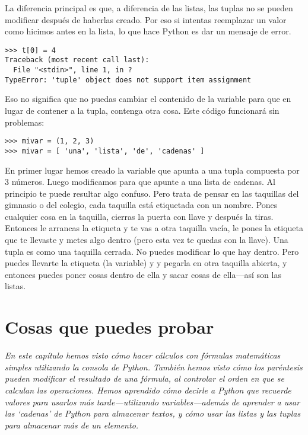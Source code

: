 La diferencia principal es que, a diferencia de las listas, las tuplas no se pueden modificar después de haberlas creado. Por eso si intentas reemplazar un valor como hicimos antes en la lista, lo que hace Python es dar un mensaje de error.

\begin{listing}
\begin{verbatim}
>>> t[0] = 4
Traceback (most recent call last):
  File "<stdin>", line 1, in ?
TypeError: 'tuple' object does not support item assignment
\end{verbatim}
\end{listing}

Eso no significa que no puedas cambiar el contenido de la variable para que en lugar de contener a la tupla, contenga otra cosa. Este código funcionará sin problemas:

\begin{listing}
\begin{verbatim}
>>> mivar = (1, 2, 3)
>>> mivar = [ 'una', 'lista', 'de', 'cadenas' ]
\end{verbatim}
\end{listing}

En primer lugar hemos creado la variable  que apunta a una tupla compuesta por 3 números. Luego modificamos  para que apunte a una lista de cadenas. Al principio te puede resultar algo confuso. Pero trata de pensar en las taquillas del gimnasio o del colegio, cada taquilla está etiquetada con un nombre. Pones cualquier cosa en la taquilla, cierras la puerta con llave y después la tiras. Entonces le arrancas la etiqueta y te vas a otra taquilla vacía, le pones la etiqueta que te llevaste y metes algo dentro (pero esta vez te quedas con la llave). Una tupla es como una taquilla cerrada. No puedes modificar lo que hay dentro. Pero puedes llevarte la etiqueta (la variable) y y pegarla en otra taquilla abierta, y entonces puedes poner cosas dentro de ella y sacar cosas de ella---así son las listas.

\section{Cosas que puedes probar}

\emph{En este capítulo hemos visto cómo hacer cálculos con fórmulas matemáticas simples utilizando la consola de Python. También hemos visto cómo los paréntesis pueden modificar el resultado de una fórmula, al controlar el orden en que se calculan las operaciones. Hemos aprendido cómo decirle a Python que recuerde valores para usarlos más tarde---utilizando variables---además de aprender a usar las `cadenas' de Python para almacenar textos, y cómo usar las listas y las tuplas para almacenar más de un elemento.}
\par

